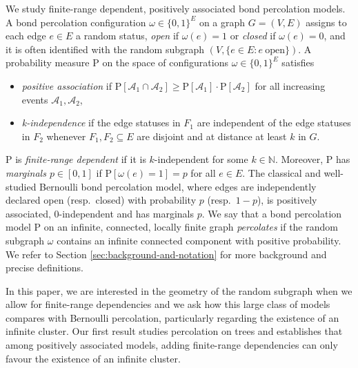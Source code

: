 \documentclass[11pt]{article}
\renewcommand{\P}{\mathrm{P}}
\theoremstyle{remark}
\begin{document}
We study finite-range dependent, positively associated bond percolation models. A bond percolation configuration $\omega \in \{0,1\}^E$   on a graph $G=(V,E)$ assigns to each edge $e \in E$ a random status, \emph{open} if $\omega(e)=1$  or \emph{closed} if $\omega(e)=0$, and it is often identified with the random subgraph $(V,\{e \in E: e\ \text{open} \})$. A probability measure $\P$ on the space of configurations $\omega \in \{0,1\}^E$ satisfies 
\begin{itemize}
	\item \emph{positive association} if $\P[\mathcal A_1\cap \mathcal A_2]\ge \P[\mathcal A_1]\cdot \P[\mathcal A_2]$ for all increasing events $\mathcal A_1,\mathcal A_2$,
	\item \emph{k-independence} if the edge statuses in $F_1$ are independent of the edge statuses in $F_2$ whenever $F_1,F_2 \subseteq E$ are disjoint and at distance at least $k$ in $G$.	
\end{itemize}
$\P$ is \emph{finite-range dependent} if it is $k$-independent for some $k \in \mathbb N$. Moreover, $\P$ has \emph{marginals $p \in [0,1]$} if $\P[\omega(e)=1]=p$ for all $e \in E$. The classical and well-studied Bernoulli bond percolation model, where edges are independently declared  open (resp.\ closed) with probability $p$  (resp.\ $1-p$), is positively associated, $0$-independent and has marginals $p$.
We say that a bond percolation model $\P$ on an infinite, connected, locally finite graph \emph{percolates} if the random subgraph $\omega$  contains an infinite connected component with positive probability.   We refer to Section \ref{sec:background-and-notation} for more background and precise definitions.

In this paper, we are interested in the geometry of the random subgraph when we allow for finite-range dependencies and we ask how this large class of models compares with Bernoulli percolation, particularly regarding the existence of an infinite cluster.  
Our first result studies percolation on trees and establishes that among positively associated models, adding finite-range dependencies can only favour the existence of an infinite cluster. 
\end{document}

